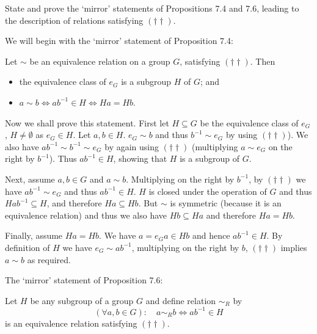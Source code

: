 \begin{problem}
	State and prove the `mirror' statements of Propositions 7.4 and 7.6, leading to the description of relations satisfying $(\dagger \dagger)$.
\end{problem}

\begin{solution}
	We will begin with the `mirror' statement of Proposition 7.4:
	
	\begin{proposition}
		Let $\sim$ be an equivalence relation on a group $G$, satisfying $(\dagger \dagger)$. Then
		\begin{itemize}
			\item the equivalence class of $e_G$ is a subgroup $H$ of $G$; and
			\item $a \sim b \Longleftrightarrow ab^{-1} \in H \Longleftrightarrow Ha = Hb$.
		\end{itemize}
	\end{proposition}

	Now we shall prove this statement. First let $H \subseteq G$ be the equivalence class of $e_G$, $H \neq \emptyset$ as $e_G \in H$. Let $a, b \in H$. $e_G \sim b$ and thus $b^{-1} \sim e_G$ by using $(\dagger \dagger)$). We also have $a b^{-1} \sim b^{-1} \sim e_G$ by again using $(\dagger \dagger)$ (multiplying $a \sim e_G$ on the right by $b^{-1}$). Thus $ab^{-1} \in H$, showing that $H$ is a subgroup of $G$.
	
	Next, assume $a, b \in G$ and $a \sim b$. Multiplying on the right by $b^{-1}$, by $(\dagger \dagger)$ we have $a b^{-1} \sim e_G$ and thus $a b^{-1} \in H$. $H$ is closed under the operation of $G$ and thus $Hab^{-1} \subseteq H$, and therefore $Ha \subseteq Hb$. But $\sim$ is symmetric (because it is an equivalence relation) and thus we also have $Hb \subseteq Ha$ and therefore $Ha = Hb$.
	
	Finally, assume $Ha = Hb$. We have $a = e_G a \in Hb$ and hence $a b^{-1} \in H$. By definition of $H$ we have $e_G \sim a b^{-1}$, multiplying on the right by $b$, $(\dagger \dagger)$ implies $a \sim b$ as required.
	
	The `mirror' statement of Proposition 7.6:
	
	\begin{proposition}
		Let $H$ be any subgroup of a group $G$ and define relation $\sim_R$ by
		\[
			(\forall a, b \in G):\quad a \sim_R b \Longleftrightarrow ab^{-1} \in H
		\]
		is an equivalence relation satisfying $(\dagger \dagger)$.
	\end{proposition}


\end{solution}
